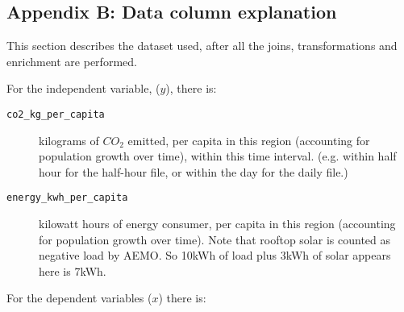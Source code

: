 \subsection*{Appendix B: Data column explanation}

This section describes the dataset used, after all the joins, transformations and enrichment are performed.

For the independent variable, ($y$), there is:

\begin{description}
    \item[\texttt{co2\_kg\_per\_capita}] kilograms of $CO_2$ emitted, per capita in this region (accounting for population growth over time), within this time interval. (e.g. within half hour for the half-hour file, or within the day for the daily file.)
    \item[\texttt{energy\_kwh\_per\_capita}] kilowatt hours of energy consumer, per capita in this region (accounting for population growth over time). Note that rooftop solar is counted as negative load by AEMO. So 10kWh of load plus 3kWh of solar appears here is 7kWh.
\end{description}

For the dependent variables ($x$) there is:

